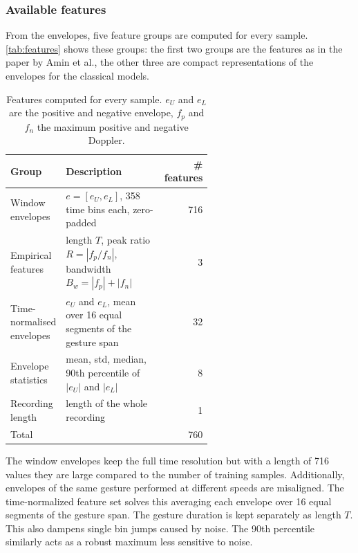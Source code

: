 \documentclass[10pt,a4paper,titlepage]{article}
\makeatletter
\renewcommand{\cite}[1]{\unskip%
  \@ifundefined{citeused@#1}%
    {\global\@namedef{citeused@#1}{}\footnote{\@nameuse{citetext@#1}\label{fn:#1}}}%
    {\textsuperscript{\ref{fn:#1}}}}
\newcommand{\placeholder}[1]{\begin{placeholderbox}#1\end{placeholderbox}}
\makeatother
\begin{document}
\subsubsection{Available features}
\label{sec:feature_list}
From the envelopes, five feature groups are computed for every sample. \autoref{tab:features} shows these groups: the first two groups are the features as in the paper by Amin et al., the other three are compact representations of the envelopes for the classical models.

\begin{table}[H]
  \centering
  \caption{Features computed for every sample. $e_U$ and $e_L$ are the positive and negative envelope, $f_p$ and $f_n$ the maximum positive and negative Doppler.}
  \label{tab:features}
  \begin{tabular}{@{}lp{0.58\linewidth}r@{}}
    \toprule
    Group & Description & \# features \\
    \midrule
    Window envelopes          & $e = [e_U, e_L]$, 358 time bins each, zero-padded \cite{amin2019} & 716 \\
    Empirical features        & length $T$, peak ratio $R = |f_p / f_n|$, bandwidth $B_w = |f_p| + |f_n|$ \cite{amin2019} & 3 \\
    Time-normalised envelopes & $e_U$ and $e_L$, mean over 16 equal segments of the gesture span & 32 \\
    Envelope statistics       & mean, std, median, 90th percentile of $|e_U|$ and $|e_L|$ & 8 \\
    Recording length          & length of the whole recording & 1 \\
    \midrule
    Total                     & & 760 \\
    \bottomrule
  \end{tabular}
\end{table}

\noindent
The window envelopes keep the full time resolution but with a length of 716 values they are large compared to the number of training samples. Additionally, envelopes of the same gesture performed at different speeds are misaligned. The time-normalized feature set solves this averaging each envelope over 16 equal segments of the gesture span. The gesture duration is kept separately as length $T$. This also dampens single bin jumps caused by noise. The 90th percentile similarly acts as a robust maximum less sensitive to noise.


\end{document}
